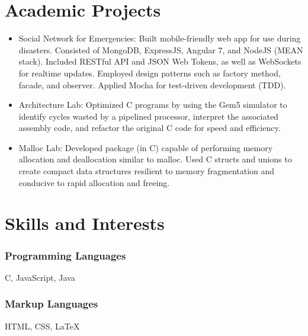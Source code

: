 \documentclass[12pt]{res} %
\begin{document}
\begin{resume}
        \section{Academic Projects}
          \begin{itemize}[leftmargin=-0.4cm]
          \itemsep0em
          \item Social Network for Emergencies: Built mobile-friendly web app for use during disasters. Consisted of MongoDB, ExpressJS, Angular 7, and NodeJS (MEAN stack). Included RESTful API and JSON Web Tokens, as well as WebSockets for realtime updates. Employed design patterns such as factory method, facade, and observer. Applied Mocha for test-driven development (TDD).
          \item Architecture Lab: Optimized C programs by using the Gem5 simulator to identify cycles wasted by a pipelined processor, interpret the associated assembly code, and refactor the original C code for speed and efficiency.
          \item Malloc Lab: Developed package (in C) capable of performing memory allocation and deallocation similar to malloc. Used C structs and unions to create compact data structures resilient to memory fragmentation and conducive to rapid allocation and freeing.
          \end{itemize}
          \vspace{-12pt}

        \section{Skills and Interests}
          \vspace{3pt}

          \begin{multicols}{3}

            \subsubsection{Programming Languages}
            \vspace{-22pt}
            C, JavaScript, Java
            \vspace{-28pt}

            \subsubsection{Markup Languages}
            \vspace{-22pt}
            HTML, CSS, \LaTeX
            \vspace{-28pt}


\end{multicols}
\end{resume}
\end{document}
